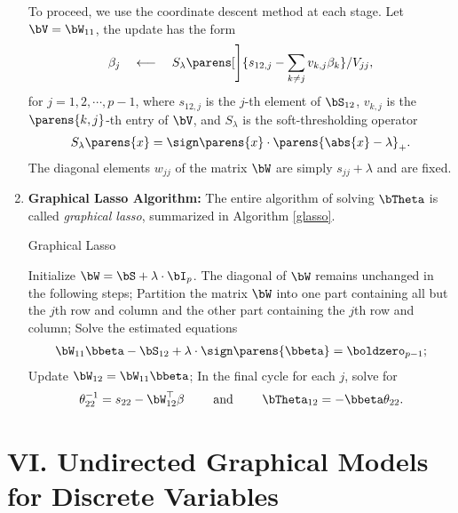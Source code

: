 \documentclass[12pt]{article}
\begin{document}
\begin{enumerate}[label=\textbf{\arabic*.}]
	To proceed, we use the coordinate descent method at each stage. Let $\bV = \bW_{11}$, the update has the form 
	\begin{align}
		\beta_j \quad \longleftarrow \quad S_{\lambda} \parens[\Bigg]{s_{12,j} - \sum_{k \neq j} v_{k,j}\beta_k} / V_{jj}, 
	\end{align}
	for $j = 1, 2, \cdots, p-1$, where $s_{12,j}$ is the $j$-th element of $\bS_{12}$, $v_{k,j}$ is the $\parens{k, j}$-th entry of $\bV$, and $S_{\lambda}$ is the soft-thresholding operator 
	\begin{align*}
		S_{\lambda} \parens{x} = \sign \parens{x} \cdot \parens{\abs{x} - \lambda}_+. 
	\end{align*}
	The diagonal elements $w_{jj}$ of the matrix $\bW$ are simply $s_{jj} + \lambda$ and are fixed. 
	
	\item \textbf{Graphical Lasso Algorithm:} The entire algorithm of solving $\bTheta$ is called \textit{graphical lasso}, summarized in Algorithm \ref{glasso}. 
	
	\begin{minipage}{\linewidth}
		\begin{algorithm}[H]
			\caption{Graphical Lasso}\label{glasso}
			\begin{algorithmic}[1]
				\STATE Initialize $\bW = \bS + \lambda \cdot \bI_p$. The diagonal of $\bW$ remains unchanged in the following steps; 
				\REPEAT
				\STATE Partition the matrix $\bW$ into one part containing all but the $j$th row and column and the other part containing the $j$th row and column; 
				\STATE Solve the estimated equations 
				\begin{align*}
					\bW_{11} \bbeta - \bS_{12} + \lambda \cdot \sign \parens{\bbeta} = \boldzero_{p-1}; 
				\end{align*}
				\STATE Update $\bW_{12} = \bW_{11} \bbeta$; 
				\ENDFOR
				\STATE In the final cycle for each $j$, solve for 
				\begin{align*}
					\theta_{22}^{-1} = s_{22} - \bW_{12}^\top \beta \qquad \text{ and } \qquad \bTheta_{12} = - \bbeta \theta_{22}.  
				\end{align*}
			\end{algorithmic}
		\end{algorithm}
	\end{minipage}

\end{enumerate}


\section*{VI. Undirected Graphical Models for Discrete Variables}
\end{document}
